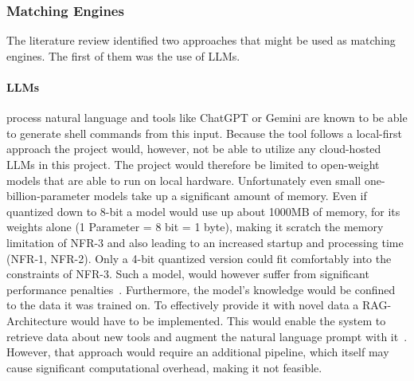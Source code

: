 \subsubsection{Matching Engines}\label{sec:engines}

The literature review identified two approaches that might be used as matching engines. The first of them was the use of \acp{LLM}. 

\paragraph{\acp{LLM}} process natural language and tools like ChatGPT or Gemini are known to be able to generate shell commands from this input. Because the tool follows a local-first approach the project would, however, not be able to utilize any cloud-hosted \acp{LLM} in this project. The project would therefore be limited to open-weight models that are able to run on local hardware. Unfortunately even small one-billion-parameter models take up a significant amount of memory. Even if quantized down to 8-bit a model would use up about 1000MB of memory, for its weights alone (1 Parameter = 8 bit = 1 byte), making it scratch the memory limitation of NFR-3 and also leading to an increased startup and processing time (NFR-1, NFR-2). Only a 4-bit quantized version could fit comfortably into the constraints of NFR-3. Such a model, would however suffer from significant performance penalties~\cite{lee2024exploring}. Furthermore, the model's knowledge would be confined to the data it was trained on. To effectively provide it with novel data a \ac{RAG}-Architecture would have to be implemented. This would enable the system to retrieve data about new tools and augment the natural language prompt with it~\cite{lewis2020retrieval}. However, that approach would require an additional pipeline, which itself may cause significant computational overhead, making it not feasible. 

